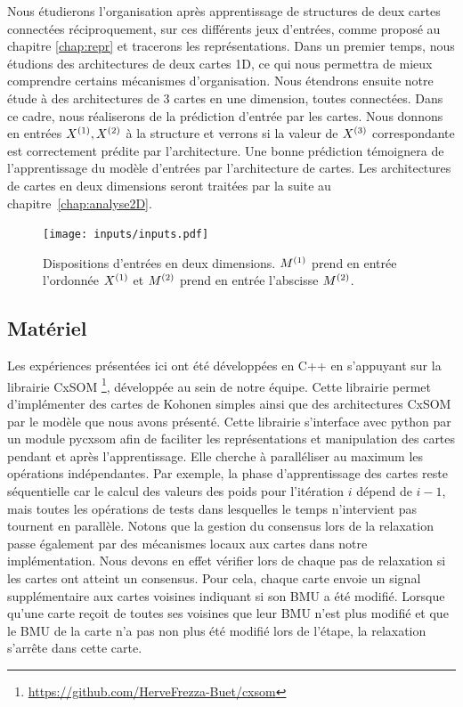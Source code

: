 \documentclass[../main]{subfiles}
\begin{document}
Nous étudierons l'organisation après apprentissage de structures de deux cartes connectées réciproquement, sur ces différents jeux d'entrées, comme proposé au chapitre \ref{chap:repr} et tracerons les représentations. 
Dans un premier temps, nous étudions des architectures de deux cartes 1D, ce qui nous permettra de mieux comprendre certains mécanismes d'organisation.
Nous étendrons ensuite notre étude à des architectures de 3 cartes en une dimension, toutes connectées. 
Dans ce cadre, nous réaliserons de la prédiction d'entrée par les cartes. Nous donnons en entrées $X^{({1})}, X^{({2})}$ à la structure et verrons si la valeur de $X^{({3})}$ correspondante est correctement prédite par l'architecture. Une bonne prédiction témoignera de l'apprentissage du modèle d'entrées par l'architecture de cartes.
Les architectures de cartes en deux dimensions seront traitées par la suite au chapitre~\ref{chap:analyse2D}.

\begin{figure}
	\texttt{[image: inputs/inputs.pdf]}
	\caption{Dispositions d'entrées en deux dimensions. $M^{({1})}$ prend en entrée l'ordonnée $X^{({1})}$ et $M^{({2})}$ prend en entrée l'abscisse $M^{({2})}$. \label{fig:input_list}}
\end{figure}

\subsection{Matériel}

Les expériences présentées ici ont été développées en C++ en s'appuyant sur la librairie CxSOM \footnote{\url{https://github.com/HerveFrezza-Buet/cxsom}}, développée au sein de notre équipe.
Cette librairie permet d'implémenter des cartes de Kohonen simples ainsi que des architectures CxSOM par le modèle que nous avons présenté.
Cette librairie s'interface avec python par un module pycxsom afin de faciliter les représentations et manipulation des cartes pendant et après l'apprentissage. Elle cherche à paralléliser au maximum les opérations indépendantes. Par exemple, la phase d'apprentissage des cartes reste séquentielle car le calcul des valeurs des poids pour l'itération $i$ dépend de $i-1$, mais toutes les opérations de tests dans lesquelles le temps n'intervient pas tournent en parallèle.
Notons que la gestion du consensus lors de la relaxation passe également par des mécanismes locaux aux cartes dans notre implémentation. Nous devons en effet vérifier lors de chaque pas de relaxation si les cartes ont atteint un consensus. Pour cela, chaque carte envoie un signal supplémentaire aux cartes voisines indiquant si son BMU a été modifié. Lorsque qu'une carte reçoit de toutes ses voisines que leur BMU n'est plus modifié et que le BMU de la carte n'a pas non plus été modifié lors de l'étape, la relaxation s'arrête dans cette carte.
\end{document}
